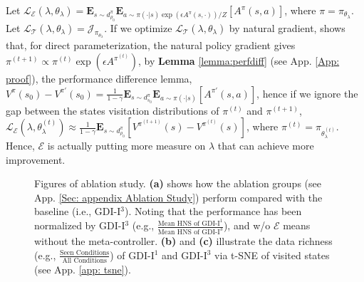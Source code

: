 \begin{Example}
\label{example: GDI meta}
    Let $\mathcal{L}_{\mathcal{E}} (\lambda, \theta_{\lambda}) = \textbf{E}_{s \sim d_{\rho_0}^{\pi}} \textbf{E}_{a \sim \pi(\cdot | s) \exp(\epsilon A^{\pi}(s, \cdot))/Z} [A^{\pi}(s, a)]$, where $\pi = \pi_{\theta_{\lambda}}$.
    Let $\mathcal{L}_{\mathcal{T}} (\lambda, \theta_{\lambda}) = \mathcal{J}_{\pi_{\theta_{\lambda}}}$.
    If we optimize $\mathcal{L}_{\mathcal{T}} (\lambda, \theta_{\lambda})$ by natural gradient, 
    \citep{pgtheory} shows that, for direct parameterization, the natural policy gradient gives $\pi^{(t+1)} \propto \pi^{(t)} \exp (\epsilon A^{\pi^{(t)}})$, by \textbf{Lemma} \ref{lemma:perfdiff} (see App. \ref{App: proof}), the performance difference lemma,
    $V^{\pi} (s_0) - V^{\pi'} (s_0) = \frac{1}{1 - \gamma} \textbf{E}_{s \sim d_{s_0}^\pi} \textbf{E}_{a \sim \pi (\cdot | s)} [ A^{\pi'} (s, a) ]$, 
    hence if we ignore the gap between the states visitation distributions of $\pi^{(t)}$ and $\pi^{(t+1)}$, 
    $\mathcal{L}_{\mathcal{E}} (\lambda, \theta_{\lambda}^{(t)}) \approx \frac{1}{1 - \gamma} \textbf{E}_{s \sim d_{\rho_0}^{\pi}} [V^{\pi^{(t+1)}}(s) - V^{\pi^{(t)}} (s)]$, 
    where $\pi^{(t)} = \pi_{\theta_{\lambda}^{(t)}}$.
    Hence, $\mathcal{E}$ is actually putting more measure on $\lambda$ that can achieve more improvement.
\end{Example}



\begin{figure*}[!t]
\caption{Figures of ablation study. \textbf{(a)} shows  how   the ablation groups (see App. \ref{Sec: appendix Ablation Study}) perform compared with the baseline (i.e., GDI-I$^3$). Noting that the performance has been normalized by GDI-I$^3$ (e.g., $\frac{\text{Mean HNS of  GDI-I}^1}{\text{Mean HNS of GDI-I}^3}$), and w/o $\mathcal{E}$ means without the meta-controller. \textbf{(b)} and \textbf{(c)} illustrate the  data richness (e.g., $\frac{\text{Seen Conditions}}{\text{All Conditions}}$) of GDI-I$^1$ and GDI-I$^3$ via t-SNE  of visited states (see App. \ref{app: tsne}).}
\label{fig:ablation study}
\end{figure*}

